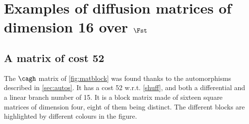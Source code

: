 \setcounter{section}{0}
\renewcommand\thesection{\Alph{section}}

\section{Examples of diffusion matrices of dimension 16 over $\Fst$}

\subsection{A matrix of cost 52}
\label{app:matt1}
The $\cagh$ matrix of \autoref{fig:matblock} was found thanks to the automorphisms described in \autoref{sec:autos}.
It has a cost 52 w.r.t. \autoref{shuff}, and both a differential and a linear branch number of 15.
It is a block matrix made of sixteen square matrices of dimension four, eight of them being distinct.
The different blocks are highlighted by different colours in the figure.

